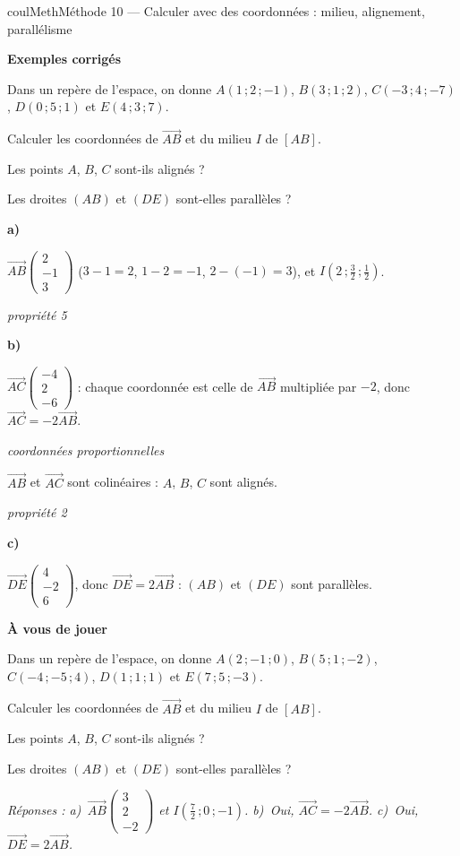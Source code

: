 \documentclass[11pt,a4paper]{article}
\makeatletter
\newcommand{\vect}[1]{\overrightarrow{#1}}
\newcounter{lycee@signet}
\newcommand{\signet}[3][]{\stepcounter{lycee@signet}%
  \edef\lycee@dest{\if\relax\detokenize{#1}\relax
    signet.\arabic{lycee@signet}\else#1\fi}%
  \hypertarget{\lycee@dest}{}\bookmark[level=#2,dest=\lycee@dest]{#3}}
\newcommand{\res}[1]{#1}
\newcounter{methode}
\newenvironment{methodebox}[1][Méthode]{\stepcounter{methode}%
  \begin{boitecours}[phantom={\signet[methode-\arabic{methode}]{2}{#1}}]{coulMeth}{#1}}%
  {\end{boitecours}}
\newcommand{\etape}[1]{\par\smallskip\textbf{\color{coulMeth}#1}\par\nobreak\smallskip}
\newcommand{\reponse}[1]{\par\smallskip
  {\footnotesize\itshape\color{black!55}Réponses : #1}}
\newcommand{\explique}[2]{\par\smallskip\noindent
  \begin{minipage}[t]{0.57\linewidth}\raggedright #1\end{minipage}\hfill
  \begin{minipage}[t]{0.40\linewidth}\raggedright\leavevmode
    {\small\itshape\color{black!60}#2}\end{minipage}\par}
\newcommand{\cas}[1]{\par\smallskip\noindent\textbf{\color{coulExo}#1}\vadjust{\nobreak}}
\newenvironment{correction}{\par}{\par}
\newcommand{\etapeexemples}{\etape{Exemples corrigés}}
\makeatother
\begin{document}
\begin{methodebox}[Méthode 10 --- Calculer avec des coordonnées : milieu, alignement, parallélisme]
\etapeexemples
Dans un repère de l'espace, on donne $A(1\,;2\,;-1)$, $B(3\,;1\,;2)$, $C(-3\,;4\,;-7)$,
$D(0\,;5\,;1)$ et $E(4\,;3\,;7)$.
\begin{questions}[label=\alph*)]
  \item Calculer les coordonnées de $\vect{AB}$ et du milieu $I$ de $[AB]$.
  \item Les points $A$, $B$, $C$ sont-ils alignés ?
  \item Les droites $(AB)$ et $(DE)$ sont-elles parallèles ?
\end{questions}
\begin{correction}
\cas{a)}
\explique{\res{$\vect{AB}\begin{pmatrix}2\\-1\\3\end{pmatrix}$} ($3-1=2$, $1-2=-1$, $2-(-1)=3$), et
\res{$I\left(2\,;\frac{3}{2}\,;\frac{1}{2}\right)$}.}{propriété 5}
\cas{b)}
\explique{$\vect{AC}\begin{pmatrix}-4\\2\\-6\end{pmatrix}$ : chaque coordonnée est celle de $\vect{AB}$
multipliée par $-2$, donc $\vect{AC}=-2\vect{AB}$.}{coordonnées proportionnelles}
\explique{$\vect{AB}$ et $\vect{AC}$ sont colinéaires : \res{$A$, $B$, $C$ sont
alignés}.}{propriété 2}
\cas{c)}
\explique{$\vect{DE}\begin{pmatrix}4\\-2\\6\end{pmatrix}$, donc $\vect{DE}=2\vect{AB}$ : \res{$(AB)$ et $(DE)$
sont parallèles}.}{}
\end{correction}

\etape{À vous de jouer}
Dans un repère de l'espace, on donne $A(2\,;-1\,;0)$, $B(5\,;1\,;-2)$, $C(-4\,;-5\,;4)$,
$D(1\,;1\,;1)$ et $E(7\,;5\,;-3)$.
\begin{questions}[label=\alph*)]
  \item Calculer les coordonnées de $\vect{AB}$ et du milieu $I$ de $[AB]$.
  \item Les points $A$, $B$, $C$ sont-ils alignés ?
  \item Les droites $(AB)$ et $(DE)$ sont-elles parallèles ?
\end{questions}
\reponse{a)~$\vect{AB}\begin{pmatrix}3\\2\\-2\end{pmatrix}$ et $I(\frac{7}{2}\,;0\,;-1)$.\; b)~Oui,
$\vect{AC}=-2\vect{AB}$.\; c)~Oui, $\vect{DE}=2\vect{AB}$.}
\end{methodebox}
\end{document}
